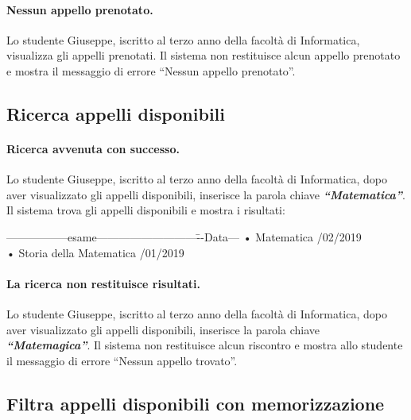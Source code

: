 \paragraph{Nessun appello prenotato.}
Lo studente Giuseppe, iscritto al terzo anno della facoltà di Informatica, visualizza gli appelli prenotati. Il sistema non restituisce alcun appello prenotato e mostra il messaggio di errore “Nessun appello prenotato”. 


\subsection{Ricerca appelli disponibili}
\paragraph{Ricerca avvenuta con successo.}
Lo studente Giuseppe, iscritto al terzo anno della facoltà di Informatica, dopo aver visualizzato gli appelli disponibili, inserisce la parola chiave \textbf{\textit{“Matematica”}}. Il sistema trova gli appelli disponibili e mostra i risultati:

\begin{tabbing}
	\hspace{1cm}-----------------esame---------------------------\=--Data---\kill
	\hspace{1cm} • Matematica  /02/2019  \\
	\hspace{1cm} • Storia della Matematica /01/2019 \\
\end{tabbing}

\paragraph{La ricerca non restituisce risultati.}
Lo studente Giuseppe, iscritto al terzo anno della facoltà di Informatica, dopo aver visualizzato gli appelli disponibili, inserisce la parola chiave \textbf{\textit{“Matemagica”}}. Il sistema non restituisce alcun riscontro e mostra allo studente il messaggio di errore “Nessun appello trovato”.


\subsection{Filtra appelli disponibili con memorizzazione}
